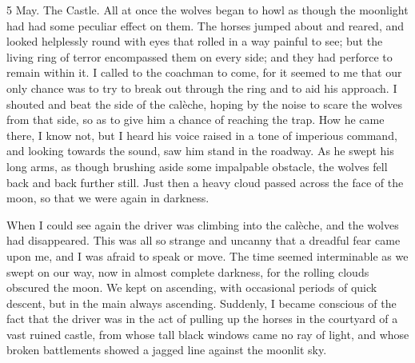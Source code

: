 \begin{diary}{5 May. The Castle.}
All at once the wolves began to howl as though the moonlight had had some peculiar effect on them. The horses jumped about and reared, and looked helplessly round with eyes that rolled in a way painful to see; but the living ring of terror encompassed them on every side; and they had perforce to remain within it. I called to the coachman to come, for it seemed to me that our only chance was to try to break out through the ring and to aid his approach. I shouted and beat the side of the calèche, hoping by the noise to scare the wolves from that side, so as to give him a chance of reaching the trap. How he came there, I know not, but I heard his voice raised in a tone of imperious command, and looking towards the sound, saw him stand in the roadway. As he swept his long arms, as though brushing aside some impalpable obstacle, the wolves fell back and back further still. Just then a heavy cloud passed across the face of the moon, so that we were again in darkness.

When I could see again the driver was climbing into the calèche, and the wolves had disappeared. This was all so strange and uncanny that a dreadful fear came upon me, and I was afraid to speak or move. The time seemed interminable as we swept on our way, now in almost complete darkness, for the rolling clouds obscured the moon. We kept on ascending, with occasional periods of quick descent, but in the main always ascending. Suddenly, I became conscious of the fact that the driver was in the act of pulling up the horses in the courtyard of a vast ruined castle, from whose tall black windows came no ray of light, and whose broken battlements showed a jagged line against the moonlit sky.
\end{diary}
